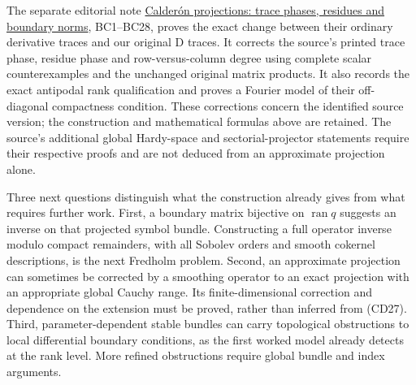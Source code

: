 \documentclass[
  11pt,
]{article}
\begin{document}
The separate editorial note
\href{../supplements/calderon-conventions-and-mixed-orders.html}{Calderón
projections: trace phases, residues and boundary norms}, BC1--BC28,
proves the exact change between their ordinary derivative traces and our
original D traces. It corrects the source's printed trace phase, residue
phase and row-versus-column degree using complete scalar counterexamples
and the unchanged original matrix products. It also records the exact
antipodal rank qualification and proves a Fourier model of their
off-diagonal compactness condition. These corrections concern the
identified source version; the construction and mathematical formulas
above are retained. The source's additional global Hardy-space and
sectorial-projector statements require their respective proofs and are
not deduced from an approximate projection alone.

Three next questions distinguish what the construction already gives
from what requires further work. First, a boundary matrix bijective on
\(\operatorname{ran}q\) suggests an inverse on that projected symbol
bundle. Constructing a full operator inverse modulo compact remainders,
with all Sobolev orders and smooth cokernel descriptions, is the next
Fredholm problem. Second, an approximate projection can sometimes be
corrected by a smoothing operator to an exact projection with an
appropriate global Cauchy range. Its finite-dimensional correction and
dependence on the extension must be proved, rather than inferred from
(CD27). Third, parameter-dependent stable bundles can carry topological
obstructions to local differential boundary conditions, as the first
worked model already detects at the rank level. More refined
obstructions require global bundle and index arguments.
\end{document}
